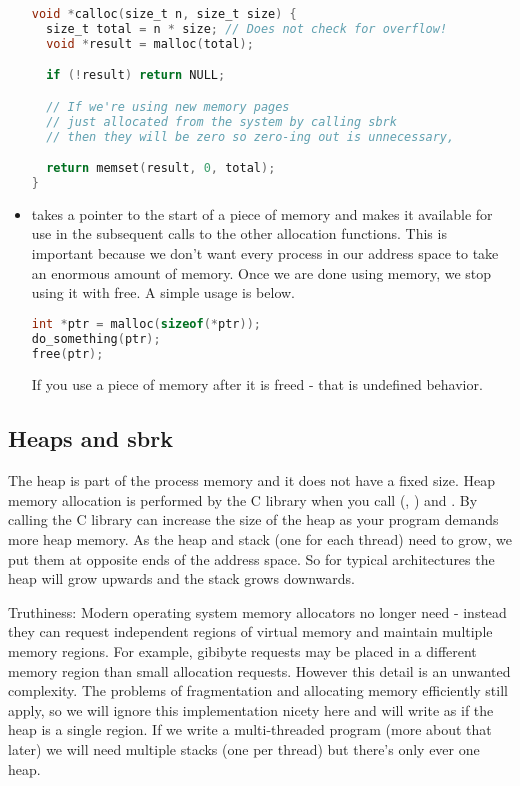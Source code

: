 \begin{itemize}
\begin{lstlisting}[language=C]
void *calloc(size_t n, size_t size) {
  size_t total = n * size; // Does not check for overflow!
  void *result = malloc(total);

  if (!result) return NULL;

  // If we're using new memory pages
  // just allocated from the system by calling sbrk
  // then they will be zero so zero-ing out is unnecessary,

  return memset(result, 0, total);
}
\end{lstlisting}

\item {} takes a pointer to the start of a piece of memory and makes it available for use in the subsequent calls to the other allocation functions.
This is important because we don't want every process in our address space to take an enormous amount of memory.
Once we are done using memory, we stop using it with free.
A simple usage is below.

\begin{lstlisting}[language=C]
int *ptr = malloc(sizeof(*ptr));
do_something(ptr);
free(ptr);
\end{lstlisting}

If you use a piece of memory after it is freed - that is undefined behavior.

\end{itemize}

\subsection{Heaps and sbrk}

The heap is part of the process memory and it does not have a fixed size.
Heap memory allocation is performed by the C library when you call  (, ) and .
By calling  the C library can increase the size of the heap as your program demands more heap memory.
As the heap and stack (one for each thread) need to grow, we put them at opposite ends of the address space.
So for typical architectures the heap will grow upwards and the stack grows downwards.

Truthiness: Modern operating system memory allocators no longer need  - instead they can request independent regions of virtual memory and maintain multiple memory regions.
For example, gibibyte requests may be placed in a different memory region than small allocation requests.
However this detail is an unwanted complexity.
The problems of fragmentation and allocating memory efficiently still apply, so we will ignore this implementation nicety here and will write as if the heap is a single region.
If we write a multi-threaded program (more about that later) we will need multiple stacks (one per thread) but there's only ever one heap.


